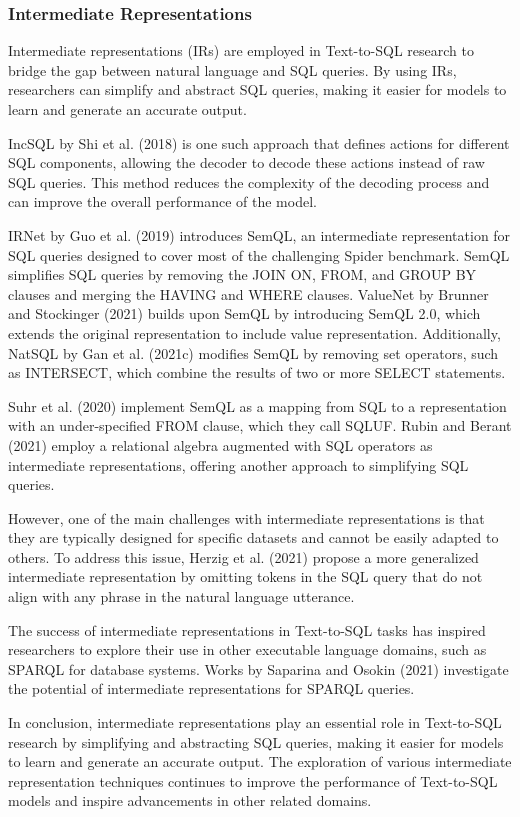 \subsubsection{Intermediate Representations}

Intermediate representations (IRs) are employed in Text-to-SQL research to bridge the gap between natural language and SQL queries. By using IRs, researchers can simplify and abstract SQL queries, making it easier for models to learn and generate an accurate output.

IncSQL by Shi et al. (2018)\cite{shi2018incsql} is one such approach that defines actions for different SQL components, allowing the decoder to decode these actions instead of raw SQL queries. This method reduces the complexity of the decoding process and can improve the overall performance of the model.

IRNet by Guo et al. (2019) \cite{DBLP:journals/corr/abs-1905-08205} introduces SemQL, an intermediate representation for SQL queries designed to cover most of the challenging Spider benchmark. SemQL simplifies SQL queries by removing the JOIN ON, FROM, and GROUP BY clauses and merging the HAVING and WHERE clauses. ValueNet by Brunner and Stockinger (2021) \cite{brunner2021valuenet} builds upon SemQL by introducing SemQL 2.0, which extends the original representation to include value representation. Additionally, NatSQL by Gan et al. (2021c) \cite{gan-etal-2021-natural-sql} modifies SemQL by removing set operators, such as INTERSECT, which combine the results of two or more SELECT statements.

Suhr et al. (2020) \cite{semql} implement SemQL as a mapping from SQL to a representation with an under-specified FROM clause, which they call SQLUF. Rubin and Berant (2021) employ a relational algebra augmented with SQL operators as intermediate representations, offering another approach to simplifying SQL queries.

However, one of the main challenges with intermediate representations is that they are typically designed for specific datasets and cannot be easily adapted to others. To address this issue, Herzig et al. (2021) \cite{herzig2021unlocking} propose a more generalized intermediate representation by omitting tokens in the SQL query that do not align with any phrase in the natural language utterance.

The success of intermediate representations in Text-to-SQL tasks has inspired researchers to explore their use in other executable language domains, such as SPARQL for database systems. Works by Saparina and Osokin (2021) \cite{saparina-osokin-2021-sparqling} investigate the potential of intermediate representations for SPARQL queries.

In conclusion, intermediate representations play an essential role in Text-to-SQL research by simplifying and abstracting SQL queries, making it easier for models to learn and generate an accurate output. The exploration of various intermediate representation techniques continues to improve the performance of Text-to-SQL models and inspire advancements in other related domains.